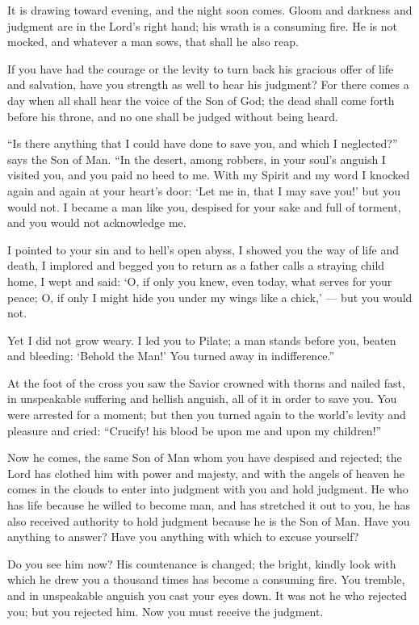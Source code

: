 It is drawing toward evening, and the night soon comes. Gloom and darkness and judgment are in the Lord’s right hand; his wrath is a consuming fire. He is not mocked, and whatever a man sows, that shall he also reap.

If you have had the courage or the levity to turn back his gracious offer of life and salvation, have you strength as well to hear his judgment? For there comes a day when all shall hear the voice of the Son of God; the dead shall come forth before his throne, and no one shall be judged without being heard.

“Is there anything that I could have done to save you, and which I neglected?” says the Son of Man. “In the desert, among robbers, in your soul’s anguish I visited you, and you paid no heed to me. With my Spirit and my word I knocked again and again at your heart’s door: ‘Let me in, that I may save you!’ but you would not. I became a man like you, despised for your sake and full of torment, and you would not acknowledge me.

I pointed to your sin and to hell’s open abyss, I showed you the way of life and death, I implored and begged you to return as a father calls a straying child home, I wept and said: ‘O, if only you knew, even today, what serves for your peace; O, if only I might hide you under my wings like a chick,’ — but you would not.

Yet I did not grow weary. I led you to Pilate; a man stands before you, beaten and bleeding: ‘Behold the Man!’ You turned away in indifference.”

At the foot of the cross you saw the Savior crowned with thorns and nailed fast, in unspeakable suffering and hellish anguish, all of it in order to save you. You were arrested for a moment; but then you turned again to the world’s levity and pleasure and cried: “Crucify! his blood be upon me and upon my children!”

Now he comes, the same Son of Man whom you have despised and rejected; the Lord has clothed him with power and majesty, and with the angels of heaven he comes in the clouds to enter into judgment with you and hold judgment. He who has life because he willed to become man, and has stretched it out to you, he has also received authority to hold judgment because he is the Son of Man. Have you anything to answer? Have you anything with which to excuse yourself?

Do you see him now? His countenance is changed; the bright, kindly look with which he drew you a thousand times has become a consuming fire. You tremble, and in unspeakable anguish you cast your eyes down. It was not he who rejected you; but you rejected him. Now you must receive the judgment.

